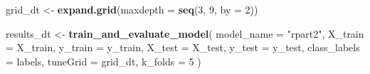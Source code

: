 \documentclass[
]{article}
\newenvironment{Shaded}{\begin{snugshade}}{\end{snugshade}}
\newcommand{\AttributeTok}[1]{\textcolor[rgb]{0.13,0.29,0.53}{#1}}
\newcommand{\DecValTok}[1]{\textcolor[rgb]{0.00,0.00,0.81}{#1}}
\newcommand{\FunctionTok}[1]{\textcolor[rgb]{0.13,0.29,0.53}{\textbf{#1}}}
\newcommand{\NormalTok}[1]{#1}
\newcommand{\OtherTok}[1]{\textcolor[rgb]{0.56,0.35,0.01}{#1}}
\newcommand{\StringTok}[1]{\textcolor[rgb]{0.31,0.60,0.02}{#1}}
\begin{document}
\begin{Shaded}
\begin{Highlighting}[]
\NormalTok{grid\_dt }\OtherTok{\textless{}{-}} \FunctionTok{expand.grid}\NormalTok{(}\AttributeTok{maxdepth =} \FunctionTok{seq}\NormalTok{(}\DecValTok{3}\NormalTok{, }\DecValTok{9}\NormalTok{, }\AttributeTok{by =} \DecValTok{2}\NormalTok{))}

\NormalTok{results\_dt }\OtherTok{\textless{}{-}} \FunctionTok{train\_and\_evaluate\_model}\NormalTok{(}
  \AttributeTok{model\_name =} \StringTok{"rpart2"}\NormalTok{,  }
  \AttributeTok{X\_train =}\NormalTok{ X\_train,}
  \AttributeTok{y\_train =}\NormalTok{ y\_train,}
  \AttributeTok{X\_test =}\NormalTok{ X\_test,}
  \AttributeTok{y\_test =}\NormalTok{ y\_test,}
  \AttributeTok{class\_labels =}\NormalTok{ labels,}
  \AttributeTok{tuneGrid =}\NormalTok{ grid\_dt,}
  \AttributeTok{k\_folds =} \DecValTok{5}
\NormalTok{)}
\end{Highlighting}
\end{Shaded}
\end{document}
